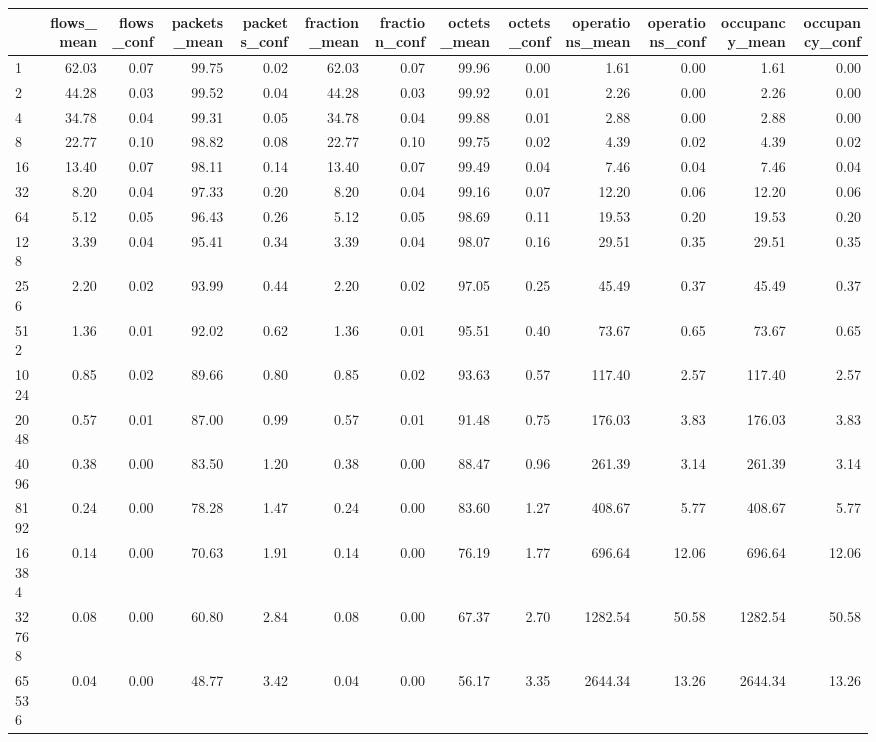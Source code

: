 \begin{tabular}{lrrrrrrrrrrrr}
\toprule
 & flows_mean & flows_conf & packets_mean & packets_conf & fraction_mean & fraction_conf & octets_mean & octets_conf & operations_mean & operations_conf & occupancy_mean & occupancy_conf \\
\midrule
1 & 62.03 & 0.07 & 99.75 & 0.02 & 62.03 & 0.07 & 99.96 & 0.00 & 1.61 & 0.00 & 1.61 & 0.00 \\
2 & 44.28 & 0.03 & 99.52 & 0.04 & 44.28 & 0.03 & 99.92 & 0.01 & 2.26 & 0.00 & 2.26 & 0.00 \\
4 & 34.78 & 0.04 & 99.31 & 0.05 & 34.78 & 0.04 & 99.88 & 0.01 & 2.88 & 0.00 & 2.88 & 0.00 \\
8 & 22.77 & 0.10 & 98.82 & 0.08 & 22.77 & 0.10 & 99.75 & 0.02 & 4.39 & 0.02 & 4.39 & 0.02 \\
16 & 13.40 & 0.07 & 98.11 & 0.14 & 13.40 & 0.07 & 99.49 & 0.04 & 7.46 & 0.04 & 7.46 & 0.04 \\
32 & 8.20 & 0.04 & 97.33 & 0.20 & 8.20 & 0.04 & 99.16 & 0.07 & 12.20 & 0.06 & 12.20 & 0.06 \\
64 & 5.12 & 0.05 & 96.43 & 0.26 & 5.12 & 0.05 & 98.69 & 0.11 & 19.53 & 0.20 & 19.53 & 0.20 \\
128 & 3.39 & 0.04 & 95.41 & 0.34 & 3.39 & 0.04 & 98.07 & 0.16 & 29.51 & 0.35 & 29.51 & 0.35 \\
256 & 2.20 & 0.02 & 93.99 & 0.44 & 2.20 & 0.02 & 97.05 & 0.25 & 45.49 & 0.37 & 45.49 & 0.37 \\
512 & 1.36 & 0.01 & 92.02 & 0.62 & 1.36 & 0.01 & 95.51 & 0.40 & 73.67 & 0.65 & 73.67 & 0.65 \\
1024 & 0.85 & 0.02 & 89.66 & 0.80 & 0.85 & 0.02 & 93.63 & 0.57 & 117.40 & 2.57 & 117.40 & 2.57 \\
2048 & 0.57 & 0.01 & 87.00 & 0.99 & 0.57 & 0.01 & 91.48 & 0.75 & 176.03 & 3.83 & 176.03 & 3.83 \\
4096 & 0.38 & 0.00 & 83.50 & 1.20 & 0.38 & 0.00 & 88.47 & 0.96 & 261.39 & 3.14 & 261.39 & 3.14 \\
8192 & 0.24 & 0.00 & 78.28 & 1.47 & 0.24 & 0.00 & 83.60 & 1.27 & 408.67 & 5.77 & 408.67 & 5.77 \\
16384 & 0.14 & 0.00 & 70.63 & 1.91 & 0.14 & 0.00 & 76.19 & 1.77 & 696.64 & 12.06 & 696.64 & 12.06 \\
32768 & 0.08 & 0.00 & 60.80 & 2.84 & 0.08 & 0.00 & 67.37 & 2.70 & 1282.54 & 50.58 & 1282.54 & 50.58 \\
65536 & 0.04 & 0.00 & 48.77 & 3.42 & 0.04 & 0.00 & 56.17 & 3.35 & 2644.34 & 13.26 & 2644.34 & 13.26 \\

\end{tabular}

